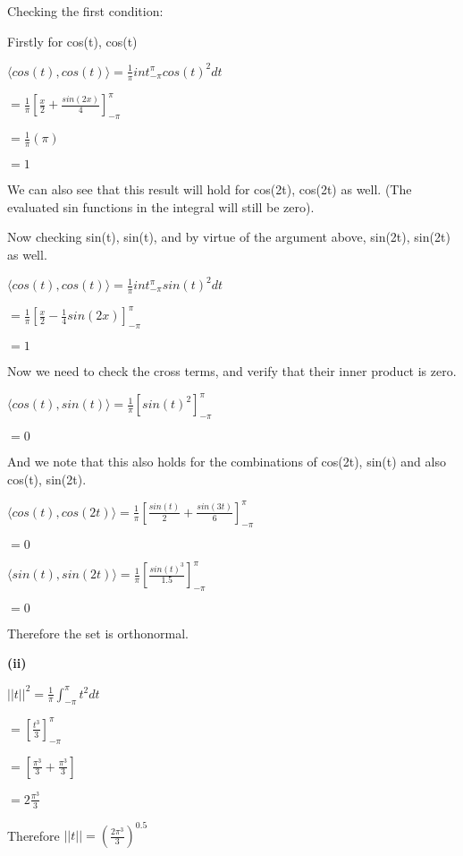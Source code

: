 \documentclass[letterpaper,12pt]{article}
\theoremstyle{definition}
\begin{document}
\begin{spacing}{1.3}{}
	Checking the first condition:
	
	Firstly for cos(t), cos(t)
	
	$\langle cos(t), cos(t) \rangle = \frac{1}{\pi}int_{-\pi}^{\pi} cos(t)^2 dt$
	
	$= \frac{1}{\pi}[\frac{x}{2} + \frac{sin(2x)}{4}]_{-\pi}^{\pi}$
	
	$= \frac{1}{\pi}(\pi)$
	
	$=1$
	
	We can also see that this result will hold for cos(2t), cos(2t) as well. (The evaluated sin functions in the integral will still be zero).
	
	Now checking sin(t), sin(t), and by virtue of the argument above, sin(2t), sin(2t) as well.
	
	$\langle cos(t), cos(t) \rangle = \frac{1}{\pi}int_{-\pi}^{\pi} sin(t)^2 dt$
	
	$= \frac{1}{\pi}[\frac{x}{2} - \frac{1}{4}sin(2x)]_{-\pi}^{\pi}$
	
	$=1$
	
	Now we need to check the cross terms, and verify that their inner product is zero.
	
	$\langle cos(t), sin(t) \rangle = \frac{1}{\pi}[sin(t)^2]_{-\pi}^{\pi}$
	
	$=0$
	
	And we note that this also holds for the combinations of cos(2t), sin(t) and also cos(t), sin(2t).
	
	$\langle cos(t), cos(2t) \rangle = \frac{1}{\pi}[\frac{sin(t)}{2} + \frac{sin(3t)}{6}]_{-\pi}^{\pi}$
	
	$=0$
	
	$\langle sin(t), sin(2t) \rangle = \frac{1}{\pi}[\frac{sin(t)^3}{1.5}]_{-\pi}^{\pi}$
	
	$=0$
	
	Therefore the set is orthonormal.
	
	\setlength{\leftskip}{10pt}
	
	\textbf{(ii)}
	
	\setlength{\leftskip}{20pt}
	
	$||t||^2 = \frac{1}{\pi}\int_{-\pi}^{\pi}t^2 dt$
	
	$= [\frac{t^3}{3}]_{-\pi}^{\pi}$
	
	$= [\frac{\pi^3}{3} + \frac{\pi^3}{3}]$
	
	$= 2\frac{\pi^3}{3}$
	
	Therefore $||t|| = (\frac{2\pi^3}{3})^{0.5}$
	
	
	\setlength{\leftskip}{10pt}
	

\end{spacing}
\end{document}
